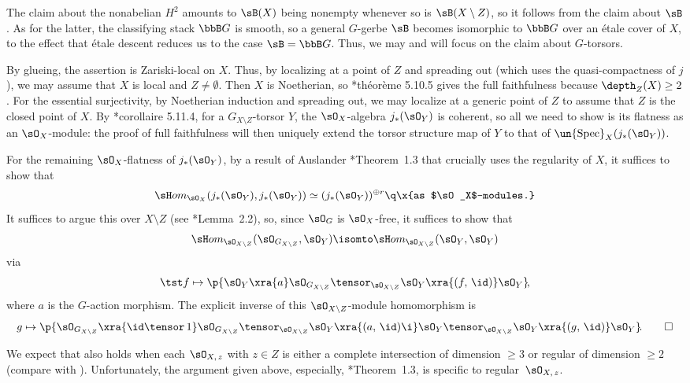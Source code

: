 \bpf
The claim about the nonabelian $H^2$ amounts to $\sB(X)$ being nonempty whenever so is $\sB(X \setminus Z)$, so it follows from the claim about $\sB$. As for the latter, the classifying stack $\bbB G$ is smooth, so a general $G$-gerbe $\sB$ becomes isomorphic to $\bbB G$ over an \'{e}tale cover of $X$, to the effect that \'{e}tale descent reduces us to the case $\sB = \bbB G$. Thus, we may and will focus on the claim about $G$-torsors.

By glueing, the assertion is Zariski-local on $X$. Thus, by localizing at a point of $Z$ and  spreading out (which uses the quasi-compactness of $j$), we may assume that $X$ is local and $Z \neq \emptyset$. Then $X$ is Noetherian, so \cite{EGAIV2}*{th\'{e}or\`{e}me 5.10.5} gives the full faithfulness because $\depth_Z(X) \ge 2$. For the %
essential surjectivity, by Noetherian induction and spreading out, we may localize at a generic point of $Z$ to assume that $Z$ is the closed point of $X$. By \cite{EGAIV2}*{corollaire 5.11.4}, for a $G_{X \setminus Z}$-torsor $Y$, the $\sO_X$-algebra $j_*(\sO_Y)$ is coherent, so all we need to show is its flatness as an $\sO_X$-module: the proof of full faithfulness will then uniquely extend the torsor structure map of $Y$ to that of $\un{\Spec}_X(j_*(\sO_Y))$.

For the remaining $\sO_X$-flatness of $j_*(\sO_Y)$, by a result of Auslander \cite{Aus62}*{Theorem~1.3} that crucially uses the regularity of $X$, it suffices to show that
\[
\sH om_{\sO_X}(j_*(\sO_Y), j_*(\sO_Y)) \simeq (j_*(\sO_Y))^{\oplus r} \q \x{as $\sO_X$-modules.}
\]
It suffices to argue this over $X\setminus Z$ (see \cite{Grothendieck-Lefschetz}*{Lemma~2.2}), so, since $\sO_G$ is $\sO_X$-free, it suffices to show that
\[
\sH om_{\sO_{X \setminus Z}}(\sO_{G_{X\setminus Z}}, \sO_Y)  \isomto  \sH om_{\sO_{X \setminus Z}}(\sO_Y, \sO_Y)
\]
via
\[
\tst f \mapsto \p{\sO_Y \xra{a} \sO_{G_{X\setminus Z}} \tensor_{\sO_{X\setminus Z}} \sO_Y \xra{(f,\, \id)}  \sO_Y }\!,
\]
where $a$ is the $G$-action morphism. The explicit inverse of this $\sO_{X \setminus Z}$-module homomorphism is
\[
g \mapsto \p{\sO_{G_{X\setminus Z}} \xra{\id  \tensor\, 1} \sO_{G_{X\setminus Z}} \tensor_{\sO_{X\setminus Z}} \sO_Y \xra{(a,\, \id)\i} \sO_Y \tensor_{\sO_{X\setminus Z}} \sO_Y \xra{(g,\, \id)}  \sO_Y }\!. \qedhere
\]
\epf

\brem\label{nonab-rem}
We expect that  also holds when each $\sO_{X,\, z}$ with $z \in Z$ is either   a complete intersection of dimension $\ge 3$ or regular of dimension $\ge 2$ (compare with ). Unfortunately, the argument given above, especially, \cite{Aus62}*{Theorem~1.3}, is specific to regular~$\sO_{X,\, z}$.  %
\erem

